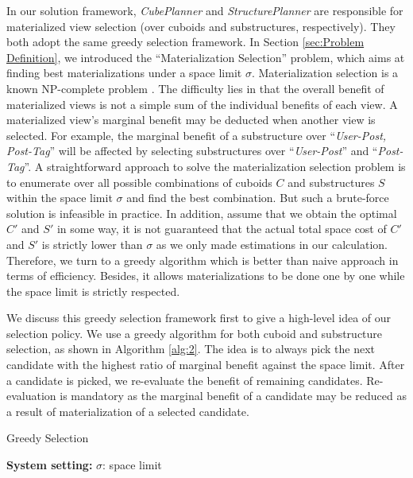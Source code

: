 	In our solution framework, \emph{CubePlanner} and \emph{StructurePlanner} are responsible for materialized view selection (over cuboids and substructures, respectively). They both adopt the same greedy selection framework. In Section \ref{sec:Problem Definition}, we introduced the ``Materialization Selection'' problem, which aims at finding best materializations under a space limit $\sigma$. Materialization selection is a known  NP-complete problem \cite{DBLP:journals/kais/LinK04}. The difficulty lies in that the overall benefit of materialized views is not a simple sum of the individual benefits of each view. A materialized view's marginal benefit may be deducted when another view is selected. For example, the marginal benefit of a substructure over ``\textit{User-Post, Post-Tag}'' will be affected by selecting substructures over ``\textit{User-Post}'' and ``\textit{Post-Tag}''. A straightforward approach to solve the materialization selection problem is to enumerate over all possible combinations of cuboids $C$ and substructures $S$ within the space limit $\sigma$ and find the best combination. But such a brute-force solution is infeasible in practice. In addition, assume that we obtain the optimal $C'$ and $S'$ in some way, it is not guaranteed that the actual total space cost of $C'$ and $S'$ is strictly lower than $\sigma$ as we only made estimations in our calculation. Therefore, we turn to a greedy algorithm which is better than naive approach in terms of efficiency. Besides, it allows materializations to be done one by one while the space limit is strictly respected.
	
	We discuss this greedy selection framework first to give a high-level idea of our selection policy. We use a greedy algorithm for both cuboid and substructure selection, as shown in Algorithm \ref{alg:2}. The idea is to always pick the next candidate with the highest ratio of marginal benefit against the space limit. After a candidate is picked, we re-evaluate the benefit of remaining candidates. Re-evaluation is mandatory as the marginal benefit of a candidate may be reduced as a result of materialization of a selected candidate.
	
	
	\begin{algorithm}[H]
		\label{alg:2}
		\caption{Greedy Selection}
		\LinesNumbered
		\textbf{System setting:} $\sigma$: space limit\\
		
	\end{algorithm}
	
